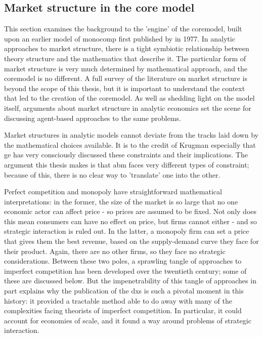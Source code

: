 \subsection{Market structure in the core model \label{sec:MarketinCore}}

This section examines the background to the 'engine' of the \gls{coremodel}, built upon an earlier model of \gls{monocomp} first published by \citeauthor{dixit_monopolistic_1977} in 1977. In analytic approaches to market structure, there is a tight symbiotic relationship between theory structure and the mathematics that describe it. The particular form of market structure is very much determined by mathematical approach, and the \gls{coremodel} is no different. A full survey of the literature on market structure is beyond the scope of this thesis, but it is important to understand the context that led to the creation of the \gls{coremodel}. As well as shedding light on the model itself, arguments about market structure in analytic economics set the scene for discussing agent-based approaches to the same problems. 

Market structures in analytic models cannot deviate from the tracks laid down by the mathematical choices available.  It is to the credit of Krugman especially that \gls{ge} has very consciously discussed these constraints and their implications. The argument this thesis makes is that \gls{abm} faces very different types of constraint; because of this, there is no clear way to 'translate' one into the other. 

Perfect competition and monopoly have straightforward mathematical interpretations: in the former, the size of the market is so large that no one economic actor can affect price - so prices are assumed to be fixed. Not only does this mean consumers can have no effect on price, but firms cannot either - and so strategic interaction is ruled out. In the latter, a monopoly firm can set a price that gives them the best revenue, based on the supply-demand curve they face for their product. Again, there are no other firms, so they face no strategic considerations. Between these two poles, a sprawling tangle of approaches to imperfect competition has been developed over the twentieth century; some of these are discussed below. But the impenetrability of this tangle of approaches in part explains why the publication of the \gls{dxs} is such a pivotal moment in this history: it provided a tractable method able to do away with many of the complexities facing theorists of imperfect competition. In particular, it could account for economies of scale, and it found a way around problems of strategic interaction.

